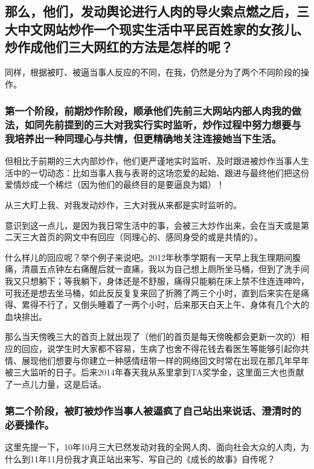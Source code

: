 \documentclass[9pt, b5paper]{article}
\begin{document}
\subsection{那么，他们，发动舆论进行人肉的导火索点燃之后，三大中文网站炒作一个现实生活中平民百姓家的女孩儿、炒作成他们三大网红的方法是怎样的呢？}
\label{sec:orgd6067cf}

同样，根据被盯、被逼当事人反应的不同，在我，仍然是分为了两个不同阶段的操作。

\subsubsection{第一个阶段，前期炒作阶段，顺承他们先前三大网站内部人肉我的做法，如同先前提到的三大对我实行实时监听，炒作过程中努力想要与我培养出一种同理心与共情，但更精确地关注连接她当下生活。}
\label{sec:orga2777b7}

但相比于前期的三大内部炒作，他们更严谨地实时监听、及时跟进被炒作当事人生活中的一切动态：比如当事人我与表哥的这场恋爱的起始、跟进与最终他们把这份爱情炒成一个稀烂（因为他们的最终目的是要逼良为娼）！

从三大盯上我、对我发动炒作，三大对我从来都是实时监听的。

意识到这一点儿，是因为我日常生活中的事，会被三大炒作出来，会在当天或是第二天三大首页的网文中有回应（同理心的、感同身受的或是共情的）。

什么样儿的回应呢？举个例子来说吧。2012年秋季学期有一天早上我生理期间腹痛，清晨五点钟左右痛醒后就一直痛，我以为自己想上厕所坐马桶，但到了洗手间我又只想躺下；等我躺下，身体还是不舒服，痛得只能躺在床上禁不住连连呻吟，可我还是想去坐马桶，如此反反复复来回了折腾了两三个小时，直到后来实在是痛得、累得不行了，又倒头睡着了一两个小时，后来那天白天上午、身体有几个大的血块排出。

那么当天傍晚三大的首页上就出现了（他们的首页是每天傍晚都会更新一次的）相应的回应，说学生时大家都不容易，生病了也舍不得花钱去看医生等能够引起你共情、展现他们想要与你建立一种感情纽带一样的网络回文时常在出现在那几年早年被三大监听的日子。后来2014年春天我从系里拿到TA奖学金，这里面三大也贡献了一点儿力量，这是后话。 

\subsubsection{第二个阶段，被盯被炒作当事人被逼疯了自己站出来说话、澄清时的必要操作。}
\label{sec:org41125e8}

这里先提一下，10年10月三大已然发动对我的全网人肉、面向社会大众的人肉，为什么到11年11月份我才真正站出来写、写自己的《成长的故事》自传呢？
\end{document}
